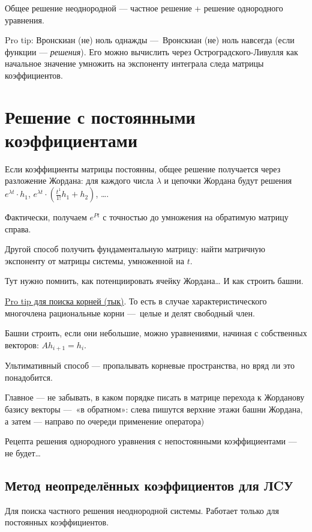 \documentclass[12pt, a4paper]{article}
\begin{document}
Общее решение неоднородной — частное решение + решение однородного уравнения.

Pro tip: Вронскиан (не) ноль однажды — Вронскиан (не) ноль навсегда (если функции — \textit{решения}).
Его можно вычислить через Остроградского-Ливулля как начальное значение умножить на экспоненту интеграла следа матрицы коэффициентов.

\section{Решение с постоянными коэффициентами}

Если коэффициенты матрицы постоянны, общее решение получается через разложение Жордана: для каждого числа $\lambda$ и цепочки Жордана будут решения
$e^{\lambda t} \cdot h_1$, $e^{\lambda t} \cdot (\frac{t^{1}}{1!} h_1 + h_2)$, ….

Фактически, получаем $e^{Pt}$ с точностью до умножения на обратимую матрицу справа.

Другой способ получить фундаментальную матрицу: найти матричную экспоненту от матрицы системы, умноженной на $t$.

Тут нужно помнить, как потенциировать ячейку Жордана… И как строить башни.

\href{https://ru.wikipedia.org/wiki/%D0%A2%D0%B5%D0%BE%D1%80%D0%B5%D0%BC%D0%B0_%D0%BE_%D1%80%D0%B0%D1%86%D0%B8%D0%BE%D0%BD%D0%B0%D0%BB%D1%8C%D0%BD%D1%8B%D1%85_%D0%BA%D0%BE%D1%80%D0%BD%D1%8F%D1%85}{Pro tip для поиска корней (тык)}.
То есть в случае характеристического многочлена рациональные корни — целые и делят свободный член.

Башни строить, если они небольшие, можно уравнениями, начиная с собственных векторов: $A h_{i + 1} = h_i$.

Ультимативный способ — пропалывать корневые пространства, но вряд ли это понадобится.

Главное — не забывать, 
в каком порядке писать в матрице перехода к Жорданову базису векторы — «в обратном»: 
слева пишутся верхние этажи башни Жордана, 
а затем — направо по очереди применение оператора)


Рецепта решения однородного уравнения с непостоянными коэффициентами — не будет…

\subsection{Метод неопределённых коэффициентов для ЛCУ}

Для поиска частного решения неоднородной системы.
Работает только для постоянных коэффициентов.
\end{document}
